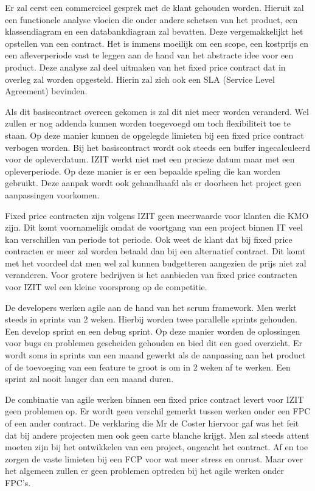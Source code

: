 \documentclass{hogent-article}
\begin{document}
    Er zal eerst een commercieel gesprek met de klant gehouden worden. Hieruit zal een functionele analyse vloeien die onder andere schetsen van het product, een klassendiagram en een databankdiagram zal bevatten. Deze vergemakkelijkt het opstellen van een contract. Het is immens moeilijk om een scope, een kostprijs en een afleverperiode vast te leggen aan de hand van het abstracte idee voor een product. Deze analyse zal deel uitmaken van het fixed price contract dat in overleg zal worden opgesteld. Hierin zal zich ook een SLA (Service Level Agreement) bevinden.
    
    Als dit basiscontract overeen gekomen is zal dit niet meer worden veranderd. Wel zullen er nog addenda kunnen worden toegevoegd om toch flexibiliteit toe te staan. Op deze manier kunnen de opgelegde limieten bij een fixed price contract verbogen worden. Bij het basiscontract wordt ook steeds een buffer ingecalculeerd voor de opleverdatum. IZIT werkt niet met een precieze datum maar met een opleverperiode. Op deze manier is er een bepaalde speling die kan worden gebruikt. Deze aanpak wordt ook gehandhaafd als er doorheen het project geen aanpassingen voorkomen.
    
    Fixed price contracten zijn volgens IZIT geen meerwaarde voor klanten die KMO zijn. Dit komt voornamelijk omdat de voortgang van een project binnen IT veel kan verschillen van periode tot periode. Ook weet de klant dat bij fixed price contracten er meer zal worden betaald dan bij een alternatief contract. Dit komt met het voordeel dat men wel zal kunnen budgetteren aangezien de prijs niet zal veranderen. Voor grotere bedrijven is het aanbieden van fixed price contracten voor IZIT wel een kleine voorsprong op de competitie.
    
    De developers werken agile aan de hand van het scrum framework. Men werkt steeds in sprints van 2 weken. Hierbij worden twee parallelle sprints gehouden. Een develop sprint en een debug sprint. Op deze manier worden de oplossingen voor bugs en problemen gescheiden gehouden en bied dit een goed overzicht. Er wordt soms in sprints van een maand gewerkt als de aanpassing aan het product of de toevoeging van een feature te groot is om in 2 weken af te werken. Een sprint zal nooit langer dan een maand duren. 
    
     De combinatie van agile werken binnen een fixed price contract levert voor IZIT geen problemen op. Er wordt geen verschil gemerkt tussen werken onder een FPC of een ander contract. De verklaring die Mr de Coster hiervoor gaf was het feit dat bij andere projecten men ook geen carte blanche krijgt. Men zal steeds attent moeten zijn bij het ontwikkelen van een project, ongeacht het contract. Af en toe zorgen de vaste limieten bij een FCP  voor wat meer stress en onrust. Maar over het algemeen zullen er geen problemen optreden bij het agile werken onder FPC's.
    
\end{document}

